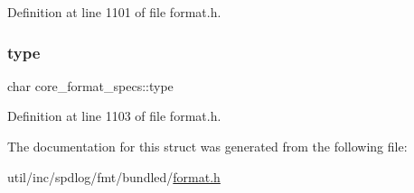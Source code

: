 Definition at line 1101 of file format.\+h.

\mbox{\label{structcore__format__specs_a2a253ba73f3cfb64fb9493cdde476535}} 
\subsubsection{\texorpdfstring{type}{type}}
{\footnotesize\ttfamily char core\+\_\+format\+\_\+specs\+::type}



Definition at line 1103 of file format.\+h.



The documentation for this struct was generated from the following file\+:\begin{DoxyCompactItemize}
\item 
util/inc/spdlog/fmt/bundled/\hyperlink{format_8h}{format.\+h}\end{DoxyCompactItemize}
